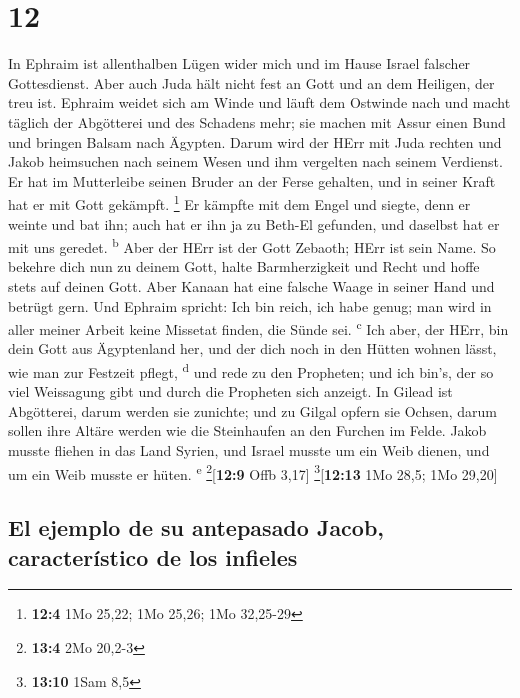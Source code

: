 \hypertarget{section-11}{%
\section{12}\label{section-11}}

 In Ephraim ist allenthalben Lügen wider mich und im Hause
Israel falscher Gottesdienst. Aber auch Juda hält nicht fest an Gott und
an dem Heiligen, der treu ist.  Ephraim weidet sich am
Winde und läuft dem Ostwinde nach und macht täglich der Abgötterei und
des Schadens mehr; sie machen mit Assur einen Bund und bringen Balsam
nach Ägypten.  Darum wird der HErr mit Juda rechten und
Jakob heimsuchen nach seinem Wesen und ihm vergelten nach seinem
Verdienst.  Er hat im Mutterleibe seinen Bruder an der
Ferse gehalten, und in seiner Kraft hat er mit Gott gekämpft.
\footnote{\textbf{12:4} 1Mo 25,22; 1Mo 25,26; 1Mo 32,25-29}
 Er kämpfte mit dem Engel und siegte, denn er weinte und
bat ihn; auch hat er ihn ja zu Beth-El gefunden, und daselbst hat er mit
uns geredet. \textsuperscript{b}  Aber der HErr ist der
Gott Zebaoth; HErr ist sein Name.  So bekehre dich nun zu
deinem Gott, halte Barmherzigkeit und Recht und hoffe stets auf deinen
Gott.  Aber Kanaan hat eine falsche Waage in seiner Hand
und betrügt gern.  Und Ephraim spricht: Ich bin reich, ich
habe genug; man wird in aller meiner Arbeit keine Missetat finden, die
Sünde sei. \textsuperscript{c}  Ich aber, der HErr, bin
dein Gott aus Ägyptenland her, und der dich noch in den Hütten wohnen
lässt, wie man zur Festzeit pflegt, \textsuperscript{d} 
und rede zu den Propheten; und ich bin's, der so viel Weissagung gibt
und durch die Propheten sich anzeigt.  In Gilead ist
Abgötterei, darum werden sie zunichte; und zu Gilgal opfern sie Ochsen,
darum sollen ihre Altäre werden wie die Steinhaufen an den Furchen im
Felde.  Jakob musste fliehen in das Land Syrien, und
Israel musste um ein Weib dienen, und um ein Weib musste er hüten.
\textsuperscript{e} \footnote{\textbf{13:4} 2Mo 20,2-3}{[}\textbf{12:9}
Offb 3,17{]} \footnote{\textbf{13:10} 1Sam 8,5}{[}\textbf{12:13} 1Mo
28,5; 1Mo 29,20{]}

\hypertarget{el-ejemplo-de-su-antepasado-jacob-caracteruxedstico-de-los-infieles}{%
\subsection{El ejemplo de su antepasado Jacob, característico de los
infieles}\label{el-ejemplo-de-su-antepasado-jacob-caracteruxedstico-de-los-infieles}}

